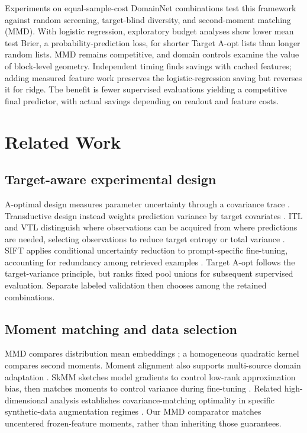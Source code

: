 Experiments on equal-sample-cost DomainNet combinations test this framework against random screening, target-blind diversity, and second-moment matching (MMD). With logistic regression, exploratory budget analyses show lower mean test Brier, a probability-prediction loss, for shorter Target A-opt lists than longer random lists. MMD remains competitive, and domain controls examine the value of block-level geometry. Independent timing finds savings with cached features; adding measured feature work preserves the logistic-regression saving but reverses it for ridge. The benefit is fewer supervised evaluations yielding a competitive final predictor, with actual savings depending on readout and feature costs.

\section{Related Work}
\subsection{Target-aware experimental design}
A-optimal design measures parameter uncertainty through a covariance trace \citep{fontaine2021}. Transductive design instead weights prediction variance by target covariates \citep{yu2006}. ITL and VTL distinguish where observations can be acquired from where predictions are needed, selecting observations to reduce target entropy or total variance \citep{hubotter2024transductive}. SIFT applies conditional uncertainty reduction to prompt-specific fine-tuning, accounting for redundancy among retrieved examples \citep{hubotter2025sift}. Target A-opt follows the target-variance principle, but ranks fixed pool unions for subsequent supervised evaluation. Separate labeled validation then chooses among the retained combinations.

\subsection{Moment matching and data selection}
MMD compares distribution mean embeddings \citep{gretton2012}; a homogeneous quadratic kernel compares second moments. Moment alignment also supports multi-source domain adaptation \citep{peng2019}. SkMM sketches model gradients to control low-rank approximation bias, then matches moments to control variance during fine-tuning \citep{dong2024skmm}. Related high-dimensional analysis establishes covariance-matching optimality in specific synthetic-data augmentation regimes \citep{rezaei2026synthetic}. Our MMD comparator matches uncentered frozen-feature moments, rather than inheriting those guarantees.

